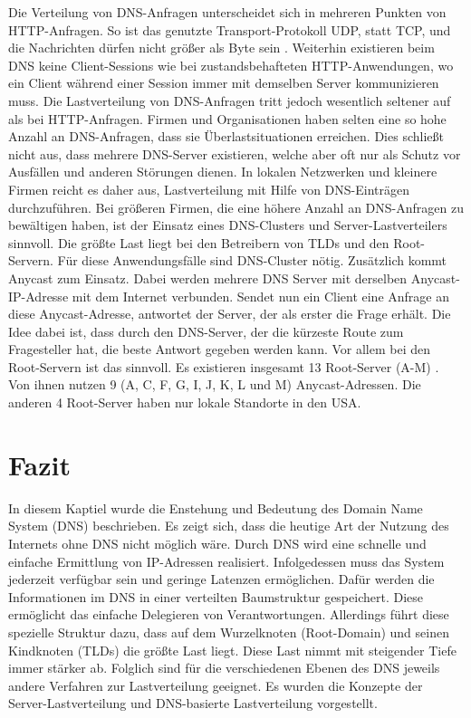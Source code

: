 \documentclass[a4paper, 12pt, BCOR10mm, DIV12, toc=bibliography, toc=listof, german]{scrbook}
\def \dns {Domain Name System (DNS)}
\begin{document}
			Die Verteilung von DNS-Anfragen unterscheidet sich in mehreren Punkten von HTTP-Anfragen. So
			ist das genutzte Transport-Protokoll UDP, statt TCP, und die Nachrichten dürfen nicht größer als
			\unit[512]{Byte} sein \cite{rfc1035}. Weiterhin existieren beim DNS keine Client-Sessions wie bei
			zustandsbehafteten HTTP-Anwendungen, wo ein Client während einer Session immer mit demselben Server
			kommunizieren muss. Die Lastverteilung von DNS-Anfragen tritt jedoch wesentlich seltener auf
			als bei HTTP-Anfragen. Firmen und Organisationen haben selten eine so hohe Anzahl an
			DNS-Anfragen, dass sie Überlastsituationen erreichen. Dies schließt nicht aus, dass mehrere
			DNS-Server existieren, welche aber oft nur als Schutz vor Ausfällen und anderen Störungen
			dienen.  In lokalen Netzwerken und kleinere Firmen reicht es daher aus, Lastverteilung mit Hilfe
			von DNS-Einträgen durchzuführen. Bei größeren Firmen, die eine höhere Anzahl an DNS-Anfragen
			zu bewältigen haben, ist der Einsatz eines DNS-Clusters und Server-Lastverteilers sinnvoll. Die
			größte Last liegt bei den Betreibern von TLDs und den Root-Servern. Für diese Anwendungsfälle
			sind DNS-Cluster nötig. Zusätzlich kommt Anycast \cite{rfc4786, sapate2005} zum Einsatz. Dabei
			werden mehrere DNS Server mit derselben Anycast-IP-Adresse mit dem Internet verbunden. Sendet
			nun ein Client eine Anfrage an diese Anycast-Adresse, antwortet der Server, der als erster die
			Frage erhält. Die Idee dabei ist, dass durch den DNS-Server, der die kürzeste Route zum
			Fragesteller hat, die beste Antwort gegeben werden kann. Vor allem bei den Root-Servern ist
			das sinnvoll. Es existieren insgesamt 13 Root-Server
			(A-M) \cite{rootserver}. Von ihnen nutzen 9 (A, C, F, G, I, J, K, L und M)
			Anycast-Adressen. Die anderen 4 Root-Server haben nur lokale Standorte in den USA.
				


		\section{Fazit} %
		\label{sec:grundlagen-fazit}

			In diesem Kaptiel wurde die Enstehung und Bedeutung des \dns{} beschrieben. Es zeigt sich,
			dass die heutige Art der Nutzung des Internets ohne DNS nicht möglich wäre. Durch DNS wird
			eine schnelle und einfache Ermittlung von IP-Adressen realisiert. Infolgedessen muss das
			System jederzeit verfügbar sein und geringe Latenzen ermöglichen. Dafür werden die
			Informationen im DNS in einer verteilten Baumstruktur gespeichert. Diese ermöglicht das
			einfache Delegieren von Verantwortungen. Allerdings führt diese spezielle Struktur dazu, dass
			auf dem Wurzelknoten (Root-Domain) und seinen Kindknoten (TLDs) die größte Last liegt. Diese
			Last nimmt mit steigender Tiefe immer stärker ab. Folglich sind für die verschiedenen Ebenen
			des DNS jeweils andere Verfahren zur Lastverteilung geeignet. Es wurden die Konzepte der
			Server-Lastverteilung und DNS-basierte Lastverteilung vorgestellt.
\end{document}
